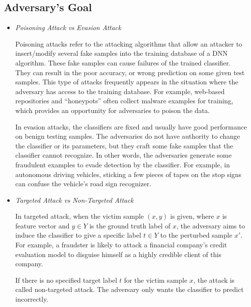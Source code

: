 		\subsection{Adversary's Goal}
		\begin{itemize}
		\item \textit{Poisoning Attack vs Evasion Attack}
		
		Poisoning attacks refer to the attacking algorithms that allow an attacker to insert/modify several fake samples into the training database of a DNN algorithm. These fake samples can cause failures of the trained classifier. They can result in the poor accuracy, or wrong prediction on some given test samples. This type of attacks frequently appears in the situation where the adversary has access to the training database. For example, web-based repositories and “honeypots” often collect malware examples for training, which provides an opportunity for adversaries to poison the data.
		
		In evasion attacks, the classifiers are fixed and usually have good performance on benign testing samples. The adversaries do not have authority to change the classifier or its parameters, but they craft some fake samples that the classifier cannot recognize. In other words, the adversaries generate some fraudulent examples to evade detection by the classifier. For example, in autonomous driving vehicles, sticking a few pieces of tapes on the stop signs can confuse the vehicle's road
sign recognizer.		

			\item \textit{Targeted Attack vs Non-Targeted Attack}
			
			In targeted attack, when the victim sample $(x, y)$ is given, where $x$ is feature vector and $y \in Y$ is the ground truth label of $x$, the adversary aims to induce the classifier to give a specific label $t \in Y$ to the perturbed sample $x'$. For example, a fraudster is likely to attack a financial company's credit evaluation model to disguise himself as a highly credible client of this company.

If there is no specified target label $t$ for the victim sample $x$, the attack is called non-targeted attack. The adversary only wants the classifier to predict incorrectly.
		\end{itemize}

